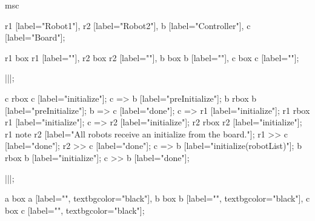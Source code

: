 \begin{msc}
msc
{

r1 [label="Robot1"],
r2 [label="Robot2"],
b [label="Controller"],
c [label="Board"];

r1 box r1 [label=""],
r2 box r2 [label=""],
b box b [label=""],
c box c [label=""];

|||;

c rbox c [label="initialize"];
c => b [label="preInitialize"];
b rbox b [label="preInitialize"];
b => c [label="done"];
c => r1 [label="initialize"]; 
r1 rbox r1 [label="initialize"];
c => r2 [label="initialize"]; 
r2 rbox r2 [label="initialize"];
r1 note r2 [label="All robots receive an initialize from the board."];
r1 >> c [label="done"];
r2 >> c [label="done"];
c => b [label="initialize(robotList)"];
b rbox b [label="initialize"];
c >> b [label="done"];

|||;

a box a [label="", textbgcolor="black"],
b box b [label="", textbgcolor="black"],
c box c [label="", textbgcolor="black"];

}
\end{msc}
